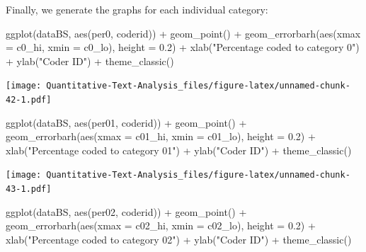 \documentclass[
]{book}
\newenvironment{Shaded}{\begin{snugshade}}{\end{snugshade}}
\newcommand{\AttributeTok}[1]{\textcolor[rgb]{0.77,0.63,0.00}{#1}}
\newcommand{\FloatTok}[1]{\textcolor[rgb]{0.00,0.00,0.81}{#1}}
\newcommand{\FunctionTok}[1]{\textcolor[rgb]{0.00,0.00,0.00}{#1}}
\newcommand{\NormalTok}[1]{#1}
\newcommand{\SpecialCharTok}[1]{\textcolor[rgb]{0.00,0.00,0.00}{#1}}
\newcommand{\StringTok}[1]{\textcolor[rgb]{0.31,0.60,0.02}{#1}}
\begin{document}
Finally, we generate the graphs for each individual category:

\begin{Shaded}
\begin{Highlighting}[]
\FunctionTok{ggplot}\NormalTok{(dataBS, }\FunctionTok{aes}\NormalTok{(per0, coderid)) }\SpecialCharTok{+} \FunctionTok{geom\_point}\NormalTok{() }\SpecialCharTok{+} \FunctionTok{geom\_errorbarh}\NormalTok{(}\FunctionTok{aes}\NormalTok{(}\AttributeTok{xmax =}\NormalTok{ c0\_hi,}
    \AttributeTok{xmin =}\NormalTok{ c0\_lo), }\AttributeTok{height =} \FloatTok{0.2}\NormalTok{) }\SpecialCharTok{+} \FunctionTok{xlab}\NormalTok{(}\StringTok{"Percentage coded to category 0"}\NormalTok{) }\SpecialCharTok{+}
    \FunctionTok{ylab}\NormalTok{(}\StringTok{"Coder ID"}\NormalTok{) }\SpecialCharTok{+} \FunctionTok{theme\_classic}\NormalTok{()}
\end{Highlighting}
\end{Shaded}

\texttt{[image: Quantitative-Text-Analysis\_files/figure-latex/unnamed-chunk-42-1.pdf]}

\begin{Shaded}
\begin{Highlighting}[]
\FunctionTok{ggplot}\NormalTok{(dataBS, }\FunctionTok{aes}\NormalTok{(per01, coderid)) }\SpecialCharTok{+} \FunctionTok{geom\_point}\NormalTok{() }\SpecialCharTok{+} \FunctionTok{geom\_errorbarh}\NormalTok{(}\FunctionTok{aes}\NormalTok{(}\AttributeTok{xmax =}\NormalTok{ c01\_hi,}
    \AttributeTok{xmin =}\NormalTok{ c01\_lo), }\AttributeTok{height =} \FloatTok{0.2}\NormalTok{) }\SpecialCharTok{+} \FunctionTok{xlab}\NormalTok{(}\StringTok{"Percentage coded to category 01"}\NormalTok{) }\SpecialCharTok{+}
    \FunctionTok{ylab}\NormalTok{(}\StringTok{"Coder ID"}\NormalTok{) }\SpecialCharTok{+} \FunctionTok{theme\_classic}\NormalTok{()}
\end{Highlighting}
\end{Shaded}

\texttt{[image: Quantitative-Text-Analysis\_files/figure-latex/unnamed-chunk-43-1.pdf]}

\begin{Shaded}
\begin{Highlighting}[]
\FunctionTok{ggplot}\NormalTok{(dataBS, }\FunctionTok{aes}\NormalTok{(per02, coderid)) }\SpecialCharTok{+} \FunctionTok{geom\_point}\NormalTok{() }\SpecialCharTok{+} \FunctionTok{geom\_errorbarh}\NormalTok{(}\FunctionTok{aes}\NormalTok{(}\AttributeTok{xmax =}\NormalTok{ c02\_hi,}
    \AttributeTok{xmin =}\NormalTok{ c02\_lo), }\AttributeTok{height =} \FloatTok{0.2}\NormalTok{) }\SpecialCharTok{+} \FunctionTok{xlab}\NormalTok{(}\StringTok{"Percentage coded to category 02"}\NormalTok{) }\SpecialCharTok{+}
    \FunctionTok{ylab}\NormalTok{(}\StringTok{"Coder ID"}\NormalTok{) }\SpecialCharTok{+} \FunctionTok{theme\_classic}\NormalTok{()}
\end{Highlighting}
\end{Shaded}
\end{document}
